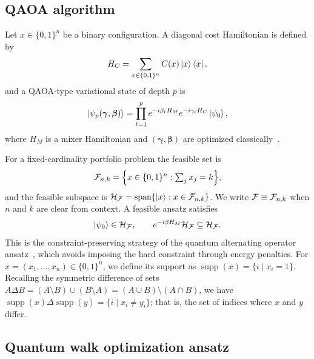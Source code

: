 \subsection{QAOA algorithm}

Let $x\in\{0,1\}^n$ be a binary configuration. A diagonal cost Hamiltonian is defined by
\begin{equation}
H_C = \sum_{x\in\{0,1\}^n} C(x)\ket{x}\bra{x},
    \label{eq:cost-hamiltonian}
\end{equation}
and a QAOA-type variational state of depth $p$ is
\begin{equation}
\ket{\psi_p(\boldsymbol{\gamma},\boldsymbol{\beta})} = \prod_{\ell=1}^{p} e^{-i\beta_\ell H_M} e^{-i\gamma_\ell H_C} \ket{\psi_0},
    \label{eq:qaoa-type-state}
\end{equation}
where $H_M$ is a mixer Hamiltonian and $(\boldsymbol{\gamma},\boldsymbol{\beta})$ are optimized classically~\cite{Farhi2014,Cerezo2021,Blekos2024}.

For a fixed-cardinality portfolio problem the feasible set is
\begin{equation}
\mathcal{F}_{n,k} = \Bigl\{ x\in\{0,1\}^{n}: \textstyle\sum_{j}x_j=k \Bigr\},
    \label{eq:feasible-set}
\end{equation}
and the feasible subspace is $\mathcal{H}_{\mathcal{F}}=\operatorname{span}\{\ket{x}:x\in\mathcal{F}_{n,k}\}$. We write $\mathcal{F}\equiv\mathcal{F}_{n,k}$ when $n$ and $k$ are clear from context. A feasible ansatz satisfies
\begin{equation}
\ket{\psi_0}\in\mathcal{H}_{\mathcal{F}}, \qquad e^{-i\beta H_M}\mathcal{H}_{\mathcal{F}} \subseteq \mathcal{H}_{\mathcal{F}} .
    \label{eq:feasible-condition}
\end{equation} 
This is the constraint-preserving strategy of the quantum alternating operator ansatz~\cite{Hadfield2019}, which avoids imposing the hard constraint through energy penalties. For $x = (x_1,\dots,x_n) \in \{0,1\}^n$, we define its support as $\operatorname{supp}(x) = \{i \mid x_i = 1\}$. Recalling the symmetric difference of sets $A \Delta B = (A \setminus B) \cup (B \setminus A) = (A \cup B) \setminus (A \cap B)$, we have $\operatorname{supp}(x) \Delta \operatorname{supp}(y) = \{i \mid x_i \neq y_i\}$; that is, the set of indices where $x$ and $y$ differ.


\subsection{\label{subsec:qwoa-general}Quantum walk optimization ansatz}

